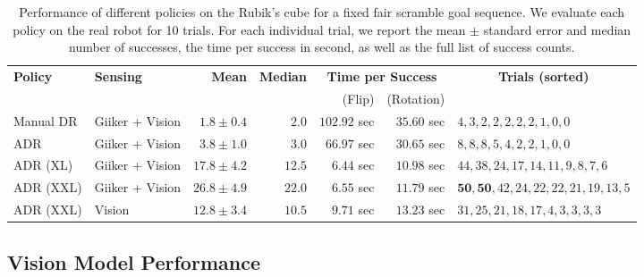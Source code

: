 \begin{table}[h]
    \caption{Performance of different policies on the Rubik's cube for a fixed fair scramble goal sequence. We evaluate each policy on the real robot for 10 trials. For each individual trial, we report the mean $\pm$ standard error and median number of successes, the time per success in second, as well as the full list of success counts.}
    \label{table:adr-full-transfer-full}
    \centering
    \renewcommand{\arraystretch}{1.3}
    \begin{tabular}{ll|rr|rr|l}
        \toprule
        \multirow{2}{*}{\textbf{Policy}}
        & \multirow{2}{*}{\textbf{Sensing}}
        & \multirow{2}{*}{\textbf{Mean}}
        & \multirow{2}{*}{\textbf{Median}}
        & \multicolumn{2}{|c}{\textbf{Time per Success}} 
        & \multicolumn{1}{|c}{\multirow{2}{*}{\textbf{Trials (sorted)}}} \\
        & & & & (Flip) & (Rotation) & \\

        \midrule
        Manual DR & Giiker + Vision 
        & $1.8 \pm 0.4$ & $2.0$  & $102.92$ sec & $35.60$ sec
        & $4,3,2,2,2,2,2,1,0,0$ \\
        ADR & Giiker + Vision 
        & $3.8 \pm 1.0$ & $3.0$ & $66.97$ sec & $30.65$ sec 
        & $8,8,8,5,4,2,2,1,0,0$ \\
        
        \midrule
        ADR (XL) & Giiker + Vision 
        & $17.8 \pm 4.2$ & $12.5$  & $\mathbf{6.44}$ sec & $\mathbf{10.98}$ sec
        & $44,38,24,17,14,11,9,8,7,6$ \\
        ADR (XXL) & Giiker + Vision 
        & $\mathbf{26.8 \pm 4.9}$ & $\mathbf{22.0}$ & $6.55$ sec & $11.79$ sec 
        & $\mathbf{50},\mathbf{50},42,24,22,22,21,19,13,5$ \\
        
        \midrule
        ADR (XXL) & Vision 
        & $12.8 \pm 3.4$ & $10.5$ & $9.71$ sec & $13.23$ sec 
        & $31,25,21,18,17,4,3,3,3,3$ \\
        \bottomrule
    \end{tabular}
\end{table}

\FloatBarrier

\subsection{Vision Model Performance}
\label{app:full-results-vision}

